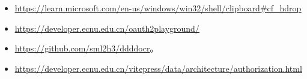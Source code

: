 \documentclass[14pt,a4paper,UTF8,twoside]{article}
\begin{document}
\begin{itemize}
    \item \href{https://learn.microsoft.com/en-us/windows/win32/shell/clipboard#cf_hdrop}{\underline{https://learn.microsoft.com/en-us/windows/win32/shell/clipboard\#cf\_hdrop}}
    \item \href{https://developer.ecnu.edu.cn/oauth2playground/}{\underline{https://developer.ecnu.edu.cn/oauth2playground/}}
    \item \href{https://github.com/sml2h3/ddddocr}{\underline{https://github.com/sml2h3/ddddocr}}。
    \item \href{https://developer.ecnu.edu.cn/vitepress/data/architecture/authorization.html}{\underline{https://developer.ecnu.edu.cn/vitepress/data/architecture/authorization.html}}
\end{itemize}
\end{document}
